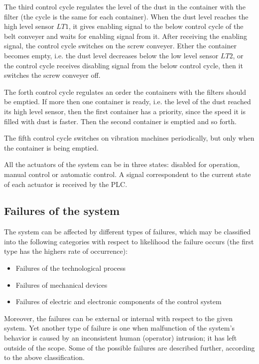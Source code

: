 The third control cycle regulates the level of the dust in the container
with the filter (the cycle is the same for each container). When the dust level
reaches the high level sensor $LT1$, it gives enabling signal to the below
control cycle of the belt conveyer and waits for enabling signal from it. After
receiving the enabling signal, the control cycle switches on the screw conveyer.
Ether the container becomes empty, i.e. the dust level decreases below the low
level sensor $LT2$, or the control cycle receives disabling signal from the
below control cycle, then it switches the screw conveyer off.

The forth control cycle regulates an order the containers with the filters
should be emptied. If more then one container is ready, i.e. the level of the
dust reached its high level sensor, then the first container has a priority,
since the speed it is filled with dust is faster. Then the second
container is emptied and so forth.

The fifth control cycle switches on vibration machines periodically, but only
when the container is being emptied.

All the actuators of the system can be in three states: disabled for operation,
manual control or automatic control. A signal correspondent to
the current state of each actuator is received by the PLC.


\subsection{Failures of the system}

The system can be affected by different types of failures, which may be
classified into the following categories with respect to likelihood the failure
occurs (the first type has the highers rate of occurrence):

\begin{itemize}
  \item Failures of the technological process
  \item Failures of mechanical devices
  \item Failures of electric and electronic components of the control system
\end{itemize}

Moreover, the failures can be external or internal with respect to the given
system. Yet another type of failure is one when malfunction of the system's
behavior is caused by an inconsistent human (operator) intrusion; it has left
outside of the scope. Some of the possible failures are described further,
according to the above classification.

